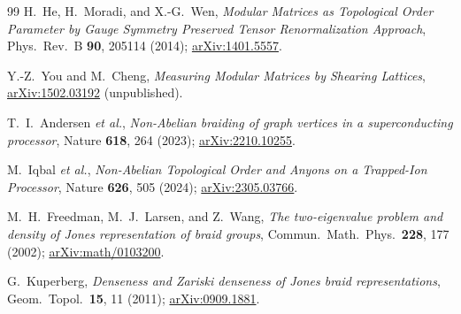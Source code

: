 \documentclass[aps,pra,twocolumn,superscriptaddress,longbibliography,floatfix,nofootinbib]{revtex4-2}
\begin{document}
\begin{thebibliography}{99}
H.~He, H.~Moradi, and X.-G.~Wen,
\emph{Modular Matrices as Topological Order Parameter by Gauge Symmetry
Preserved Tensor Renormalization Approach},
Phys.\ Rev.\ B \textbf{90}, 205114 (2014);
\href{https://arxiv.org/abs/1401.5557}{arXiv:1401.5557}.

Y.-Z.~You and M.~Cheng,
\emph{Measuring Modular Matrices by Shearing Lattices},
\href{https://arxiv.org/abs/1502.03192}{arXiv:1502.03192} (unpublished).

T.~I.~Andersen \emph{et al.},
\emph{Non-Abelian braiding of graph vertices in a superconducting processor},
Nature \textbf{618}, 264 (2023);
\href{https://arxiv.org/abs/2210.10255}{arXiv:2210.10255}.

M.~Iqbal \emph{et al.},
\emph{Non-Abelian Topological Order and Anyons on a Trapped-Ion Processor},
Nature \textbf{626}, 505 (2024);
\href{https://arxiv.org/abs/2305.03766}{arXiv:2305.03766}.

M.~H.~Freedman, M.~J.~Larsen, and Z.~Wang,
\emph{The two-eigenvalue problem and density of Jones representation of braid
groups},
Commun.\ Math.\ Phys.\ \textbf{228}, 177 (2002);
\href{https://arxiv.org/abs/math/0103200}{arXiv:math/0103200}.

G.~Kuperberg,
\emph{Denseness and Zariski denseness of Jones braid representations},
Geom.\ Topol.\ \textbf{15}, 11 (2011);
\href{https://arxiv.org/abs/0909.1881}{arXiv:0909.1881}.

\end{thebibliography}
\end{document}
